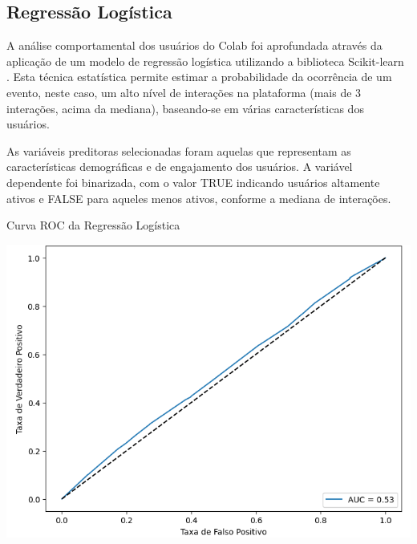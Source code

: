 \subsection*{Regressão Logística}

A análise comportamental dos usuários do Colab foi aprofundada através da aplicação de um modelo de regressão logística \cite{2010_Yu} utilizando a biblioteca Scikit-learn \cite{2011_Pedregosa}. Esta técnica estatística permite estimar a probabilidade da ocorrência de um evento, neste caso, um alto nível de interações na plataforma (mais de 3 interações, acima da mediana), baseando-se em várias características dos usuários.

As variáveis preditoras selecionadas foram aquelas que representam as características demográficas e de engajamento dos usuários. A variável dependente foi binarizada, com o valor TRUE indicando usuários altamente ativos e FALSE para aqueles menos ativos, conforme a mediana de interações.

\begin{quadro}[!htb]
	\caption{Curva ROC da Regressão Logística}
	\label{fig:regression_roc}
	\centering
	\includegraphics[scale=0.8]{images/regression_roc.png}
\end{quadro}

